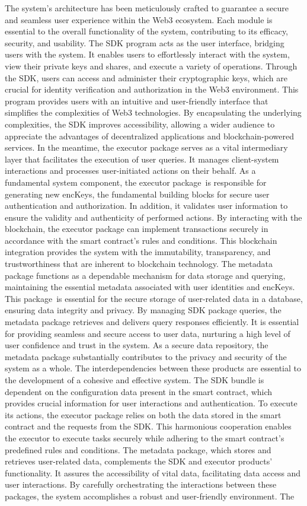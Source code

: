 \documentclass[../Main.tex]{subfiles}
\begin{document}
The system's architecture has been meticulously crafted to guarantee a secure and seamless user experience within the Web3 ecosystem. Each module is essential to the overall functionality of the system, contributing to its efficacy, security, and usability. The SDK program acts as the user interface, bridging users with the system. It enables users to effortlessly interact with the system, view their private keys and shares, and execute a variety of operations. Through the SDK, users can access and administer their cryptographic keys, which are crucial for identity verification and authorization in the Web3 environment. This program provides users with an intuitive and user-friendly interface that simplifies the complexities of Web3 technologies. By encapsulating the underlying complexities, the SDK improves accessibility, allowing a wider audience to appreciate the advantages of decentralized applications and blockchain-powered services. In the meantime, the executor package serves as a vital intermediary layer that facilitates the execution of user queries. It manages client-system interactions and processes user-initiated actions on their behalf. As a fundamental system component, the executor package is responsible for generating new encKeys, the fundamental building blocks for secure user authentication and authorization. In addition, it validates user information to ensure the validity and authenticity of performed actions. By interacting with the blockchain, the executor package can implement transactions securely in accordance with the smart contract's rules and conditions. This blockchain integration provides the system with the immutability, transparency, and trustworthiness that are inherent to blockchain technology. The metadata package functions as a dependable mechanism for data storage and querying, maintaining the essential metadata associated with user identities and encKeys. This package is essential for the secure storage of user-related data in a database, ensuring data integrity and privacy. By managing SDK package queries, the metadata package retrieves and delivers query responses efficiently. It is essential for providing seamless and secure access to user data, nurturing a high level of user confidence and trust in the system. As a secure data repository, the metadata package substantially contributes to the privacy and security of the system as a whole. The interdependencies between these products are essential to the development of a cohesive and effective system. The SDK bundle is dependent on the configuration data present in the smart contract, which provides crucial information for user interactions and authentication. To execute its actions, the executor package relies on both the data stored in the smart contract and the requests from the SDK. This harmonious cooperation enables the executor to execute tasks securely while adhering to the smart contract's predefined rules and conditions. The metadata package, which stores and retrieves user-related data, complements the SDK and executor products' functionality. It assures the accessibility of vital data, facilitating data access and user interactions. By carefully orchestrating the interactions between these packages, the system accomplishes a robust and user-friendly environment. The 
\end{document}

